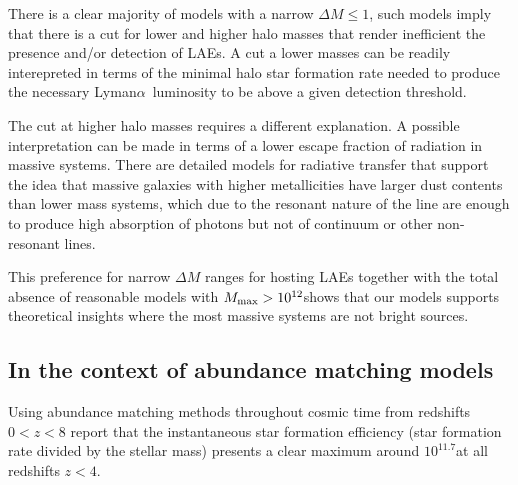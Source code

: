 \documentclass[usenatbib]{mn2e}
\newcommand{\ly}{{\ifmmode{{\rm Ly}\alpha}\else{Ly$\alpha$}\fi}}
\newcommand{\hMsun}{{\ifmmode{h^{-1}{\rm
        {M_{\odot}}}}\else{$h^{-1}{\rm{M_{\odot}}}$}\fi}}
\newcommand{\Msun}{{\ifmmode{{\rm {M_{\odot}}}}\else{${\rm{M_{\odot}}}$}\fi}}
\newcommand{\lya}{{Lyman$\alpha$~}}
\begin{document}
There is a clear majority of models with a narrow $\Delta M\leq
1$, such models imply that there is a cut for lower and higher halo masses
that render inefficient the presence and/or detection of LAEs.  A cut
a lower masses can be readily interepreted in terms of the minimal halo star
formation rate needed to produce the necessary \lya luminosity to be
above a given detection threshold. 

The cut at higher halo masses requires a different explanation. A
possible interpretation can be made in terms of a lower escape
fraction of \ly radiation in massive systems. There are detailed models for
radiative transfer that support the idea that massive galaxies with
higher metallicities have larger dust contents than lower mass
systems, which due to the resonant nature of the \ly line are enough
to produce high absorption of \ly photons but not of continuum or
other non-resonant lines.  

This preference for narrow $\Delta M$ ranges for hosting LAEs together
with the total absence of reasonable models with $M_{\rm max}>
10^{12}$\hMsun shows that our models supports theoretical insights
where the most massive systems are not bright \ly sources.  







\subsection{In the context of abundance matching models}


Using abundance matching methods throughout cosmic time from redshifts
$0<z<8$ \cite{Behroozi2013a,Behroozi2013b} report that the instantaneous star
formation efficiency (star formation rate divided by the stellar mass)
presents a clear maximum around $10^{11.7}$\Msun at all redshifts
$z<4$.
\end{document}
